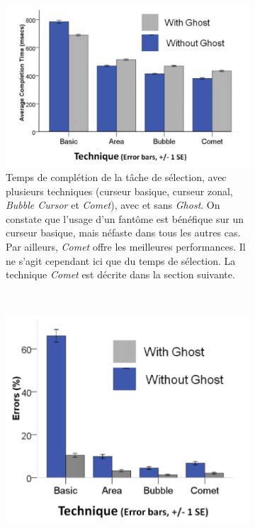 	\begin{figure}[!htb]
		\begin{subfigure}[t]{0.49\textwidth}
			\centering
			\includegraphics[width=\textwidth]{figures/ch2/cometGhostTimes}
			\caption{Temps de complétion de la tâche de sélection, avec plusieurs techniques (curseur basique, curseur zonal, \emph{Bubble Cursor} et \emph{Comet}), avec et sans \emph{Ghost}. On constate que l'usage d'un fantôme est bénéfique sur un curseur basique, mais néfaste dans tous les autres cas. Par ailleurs, \emph{Comet} offre les meilleures performances. Il ne s'agit cependant ici que du temps de sélection. La technique \emph{Comet} est décrite dans la section suivante.}
			\label{fig:cometGhostTimes}
		\end{subfigure}
		~
		\begin{subfigure}[t]{0.49\textwidth}
			\centering
			\includegraphics[width=\textwidth]{figures/ch2/cometGhostErrors}

\end{subfigure}
\end{figure}
